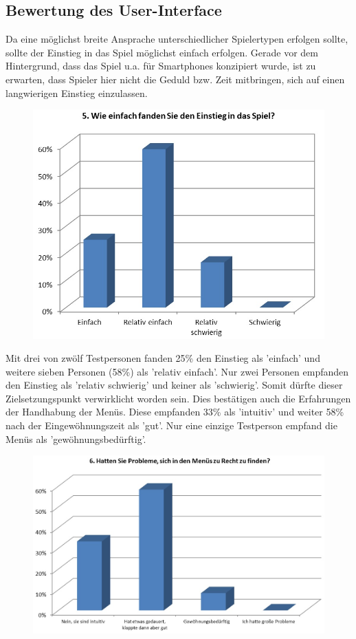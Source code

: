 \documentclass[extern,palatino]{cgBA}
\begin{document}
\subsection{Bewertung des User-Interface}
Da eine möglichst breite Ansprache unterschiedlicher Spielertypen erfolgen sollte, sollte der Einstieg in das Spiel möglichst einfach erfolgen. Gerade vor dem Hintergrund, dass das Spiel u.a. für Smartphones konzipiert wurde, ist zu erwarten, dass Spieler hier nicht die Geduld bzw. Zeit mitbringen, sich auf einen langwierigen Einstieg einzulassen. 
\begin{figure}[H]
	\centering
	\includegraphics[width=1\textwidth]{table4.jpg}
\end{figure}
Mit drei von zwölf Testpersonen fanden 25\% den Einstieg als 'einfach' und weitere sieben Personen (58\%) als 'relativ einfach'. Nur zwei Personen empfanden den Einstieg als 'relativ schwierig' und keiner als 'schwierig'. Somit dürfte dieser Zielsetzungspunkt verwirklicht worden sein. 
Dies bestätigen auch die Erfahrungen der Handhabung der Menüs. Diese empfanden 33\% als 'intuitiv' und weiter 58\% nach der Eingewöhnungszeit als 'gut'. Nur eine einzige Testperson empfand die Menüs als 'gewöhnungsbedürftig'. 
\begin{figure}[H]
	\centering
	\includegraphics[width=1\textwidth]{table5.jpg}
\end{figure}
\end{document}

